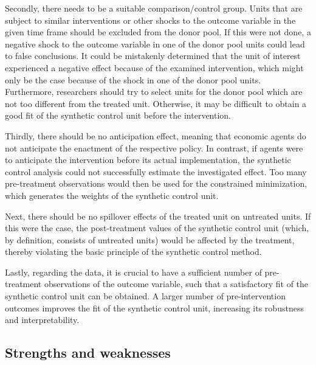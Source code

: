 \documentclass{scrbook}
\begin{document}
Secondly, there needs to be a suitable comparison/control group. Units
that are subject to similar interventions or other shocks to the outcome
variable in the given time frame should be excluded from the donor pool.
If this were not done, a negative shock to the outcome variable in one
of the donor pool units could lead to false conclusions. It could be
mistakenly determined that the unit of interest experienced a negative
effect because of the examined intervention, which might only be the
case because of the shock in one of the donor pool units. Furthermore,
researchers should try to select units for the donor pool which are not
too different from the treated unit. Otherwise, it may be difficult to
obtain a good fit of the synthetic control unit before the intervention.

Thirdly, there should be no anticipation effect, meaning that economic
agents do not anticipate the enactment of the respective policy. In
contrast, if agents were to anticipate the intervention before its
actual implementation, the synthetic control analysis could not
successfully estimate the investigated effect. Too many pre-treatment
observations would then be used for the constrained minimization, which
generates the weights of the synthetic control unit.

Next, there should be no spillover effects of the treated unit on
untreated units. If this were the case, the post-treatment values of the
synthetic control unit (which, by definition, consists of untreated
units) would be affected by the treatment, thereby violating the basic
principle of the synthetic control method.

Lastly, regarding the data, it is crucial to have a sufficient number of
pre-treatment observations of the outcome variable, such that a
satisfactory fit of the synthetic control unit can be obtained. A larger
number of pre-intervention outcomes improves the fit of the synthetic
control unit, increasing its robustness and interpretability.

\subsection*{Strengths and weaknesses}
\end{document}
